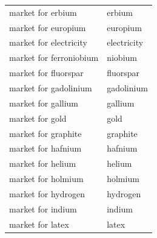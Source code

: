 \documentclass{article}
\begin{document}
\begin{longtable}{ll}
    market for erbium          & erbium                                                                                            \\
    market for europium        & europium                                                                                          \\
    market for electricity     & electricity                                                                                       \\
    market for ferroniobium    & niobium                                                                                           \\
    market for fluorspar       & fluorspar                                                                                         \\
    market for gadolinium      & gadolinium                                                                                        \\
    market for gallium         & gallium                                                                                           \\
    market for gold            & gold                                                                                              \\
    market for graphite        & graphite                                                                                          \\
    market for hafnium         & hafnium                                                                                           \\
    market for helium          & helium                                                                                            \\
    market for holmium         & holmium                                                                                           \\
    market for hydrogen        & hydrogen                                                                                          \\
    market for indium          & indium                                                                                            \\
    market for latex           & latex                                                                                             \\

\end{longtable}
\end{document}
